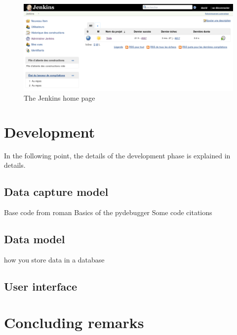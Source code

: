 \bigskip

\begin{figure}[h!]
  \centering
    \includegraphics[width=\textwidth]{figures/jenkins.png}
    \caption{The Jenkins home page}
    \label{fig:jenkins}
\end{figure}

\section{Development}

In the following point, the details of the development phase is explained in details.



\subsection{Data capture model}
Base code from roman
Basics of the pydebugger
Some code citations

\subsection{Data model}
how you store data in a database

\subsection{User interface}

\section{Concluding remarks}
